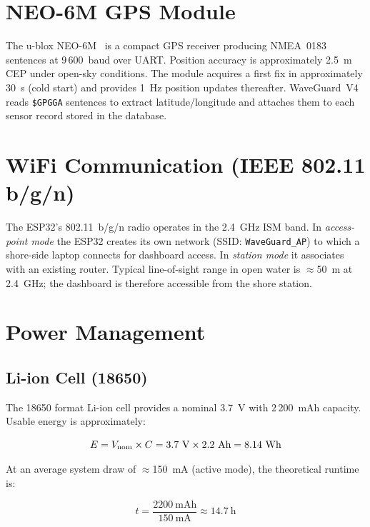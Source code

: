 \section{NEO-6M GPS Module}

The u-blox NEO-6M~\cite{ublox2011neo6m} is a compact GPS receiver producing NMEA~0183
sentences at 9\,600~baud over UART.
Position accuracy is approximately 2.5~m CEP under open-sky conditions.
The module acquires a first fix in approximately 30~s (cold start) and provides
1~Hz position updates thereafter.
WaveGuard~V4 reads \verb|$GPGGA| sentences to extract latitude/longitude and
attaches them to each sensor record stored in the database.

\section{WiFi Communication (IEEE 802.11 b/g/n)}

The ESP32's 802.11~b/g/n radio operates in the 2.4~GHz ISM band.
In \textit{access-point mode} the ESP32 creates its own network (SSID:
\texttt{WaveGuard\_AP}) to which a shore-side laptop connects for dashboard access.
In \textit{station mode} it associates with an existing router.
Typical line-of-sight range in open water is $\approx$50~m at 2.4~GHz; the
dashboard is therefore accessible from the shore station.

\section{Power Management}

\subsection{Li-ion Cell (18650)}

The 18650 format Li-ion cell provides a nominal 3.7~V with 2\,200~mAh capacity.
Usable energy is approximately:

\begin{equation}
  E = V_{\rm nom} \times C = 3.7~\textrm{V} \times 2.2~\textrm{Ah}
    = 8.14~\textrm{Wh}
\end{equation}

At an average system draw of $\approx$150~mA (active mode), the theoretical runtime is:

\begin{equation}
  t = \frac{2200~\textrm{mAh}}{150~\textrm{mA}} \approx 14.7~\textrm{h}
\end{equation}

